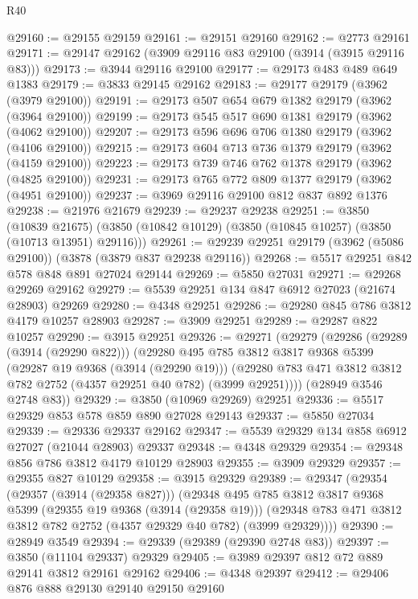 \begin{lexlean}{R40}
\begin{coremodule}
@29160 := @29155 @29159
@29161 := @29151 @29160
@29162 := @2773 @29161
@29171 := @29147 @29162 (@3909 @29116 @83 @29100 (@3914 (@3915 @29116 @83)))
@29173 := @3944 @29116 @29100
@29177 := @29173 @483 @489 @649 @1383
@29179 := @3833 @29145 @29162
@29183 := @29177 @29179 (@3962 (@3979 @29100))
@29191 := @29173 @507 @654 @679 @1382 @29179 (@3962 (@3964 @29100))
@29199 := @29173 @545 @517 @690 @1381 @29179 (@3962 (@4062 @29100))
@29207 := @29173 @596 @696 @706 @1380 @29179 (@3962 (@4106 @29100))
@29215 := @29173 @604 @713 @736 @1379 @29179 (@3962 (@4159 @29100))
@29223 := @29173 @739 @746 @762 @1378 @29179 (@3962 (@4825 @29100))
@29231 := @29173 @765 @772 @809 @1377 @29179 (@3962 (@4951 @29100))
@29237 := @3969 @29116 @29100 @812 @837 @892 @1376
@29238 := @21976 @21679
@29239 := @29237 @29238
@29251 := @3850
    (@10839 @21675)
    (@3850 (@10842 @10129) (@3850 (@10845 @10257) (@3850 (@10713 @13951) @29116)))
@29261 := @29239 @29251 @29179 (@3962 (@5086 @29100)) (@3878 (@3879 @837 @29238 @29116))
@29268 := @5517 @29251 @842 @578 @848 @891 @27024 @29144
@29269 := @5850 @27031
@29271 := @29268 @29269 @29162
@29279 := @5539 @29251 @134 @847 @6912 @27023 (@21674 @28903) @29269
@29280 := @4348 @29251
@29286 := @29280 @845 @786 @3812 @4179 @10257 @28903
@29287 := @3909 @29251
@29289 := @29287 @822 @10257
@29290 := @3915 @29251
@29326 := @29271
    (@29279
      (@29286
        (@29289 (@3914 (@29290 @822)))
        (@29280
          @495
          @785
          @3812
          @3817
          @9368
          @5399
          (@29287 @19 @9368 (@3914 (@29290 @19)))
          (@29280 @783 @471 @3812 @3812 @782 @2752 (@4357 @29251 @40 @782) (@3999 @29251))))
      (@28949 @3546 @2748 @83))
@29329 := @3850 (@10969 @29269) @29251
@29336 := @5517 @29329 @853 @578 @859 @890 @27028 @29143
@29337 := @5850 @27034
@29339 := @29336 @29337 @29162
@29347 := @5539 @29329 @134 @858 @6912 @27027 (@21044 @28903) @29337
@29348 := @4348 @29329
@29354 := @29348 @856 @786 @3812 @4179 @10129 @28903
@29355 := @3909 @29329
@29357 := @29355 @827 @10129
@29358 := @3915 @29329
@29389 := @29347
    (@29354
      (@29357 (@3914 (@29358 @827)))
      (@29348
        @495
        @785
        @3812
        @3817
        @9368
        @5399
        (@29355 @19 @9368 (@3914 (@29358 @19)))
        (@29348 @783 @471 @3812 @3812 @782 @2752 (@4357 @29329 @40 @782) (@3999 @29329))))
@29390 := @28949 @3549
@29394 := @29339 (@29389 (@29390 @2748 @83))
@29397 := @3850 (@11104 @29337) @29329
@29405 := @3989 @29397 @812 @72 @889 @29141 @3812 @29161 @29162
@29406 := @4348 @29397
@29412 := @29406 @876 @888 @29130 @29140 @29150 @29160

\end{coremodule}
\end{lexlean}
